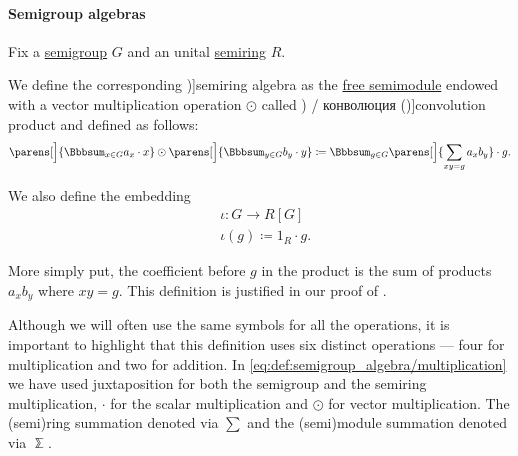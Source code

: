 \paragraph{Semigroup algebras}
\begin{definition}\label{def:semigroup_algebra}
  Fix a \hyperref[def:semigroup]{semigroup} \( G \) and an unital \hyperref[def:semiring]{semiring} \( R \).

  We define the corresponding \term[ru=групповая алгебра (\cite[504]{Винберг2014})]{semiring algebra} as the \hyperref[def:free_semimodule]{free semimodule} endowed with a vector multiplication operation \( \odot \) called \term[ru=свёртка (\cite[62]{Боровков1999Вероятности}) / конволюция (\cite[179]{ИоффеТихомиров1974})]{convolution product} and defined as follows:
  \begin{equation}\label{eq:def:semigroup_algebra/multiplication}
    \parens[\Big]{ \Bbbsum_{x \in G} a_x \cdot x } \odot \parens[\Big]{ \Bbbsum_{y \in G} b_y \cdot y }
    \coloneqq
    \Bbbsum_{g \in G} \parens[\Big]{ \sum_{xy = g} a_x b_y } \cdot g.
  \end{equation}

  We also define the embedding
  \begin{equation}\label{eq:def:semigroup_algebra/embedding}
    \begin{aligned}
      &\iota: G \to R[G] \\
      &\iota(g) \coloneqq 1_R \cdot g.
    \end{aligned}
  \end{equation}
\end{definition}
\begin{comments}
  \item More simply put, the coefficient before \( g \) in the product is the sum of products \( a_x b_y \) where \( xy = g \). This definition is justified in our proof of .

  \item Although we will often use the same symbols for all the operations, it is important to highlight that this definition uses six distinct operations --- four for multiplication and two for addition. In \eqref{eq:def:semigroup_algebra/multiplication} we have used juxtaposition for both the semigroup and the semiring multiplication, \( \cdot \) for the scalar multiplication and \( \odot \) for vector multiplication. The (semi)ring summation denoted via \( \sum \) and the (semi)module summation denoted via \( \Bbbsum \).
\end{comments}

